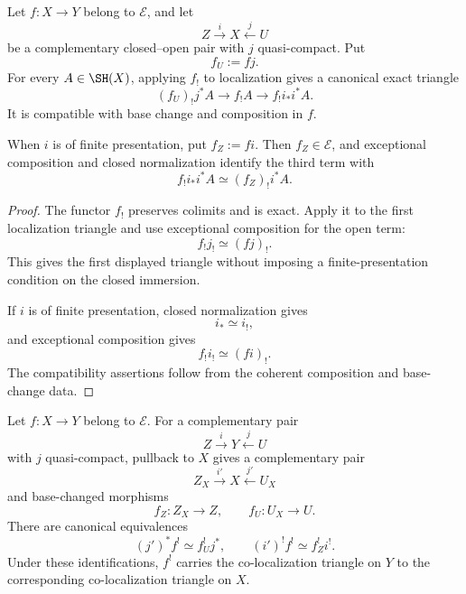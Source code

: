 \begin{proposition}
\label{prop:exceptional-direct-image-localization}
Let \(f:X\to Y\) belong to \(\mathcal E\), and let
\[
    Z\xrightarrow{i}X\xleftarrow{j}U
\]
be a complementary closed--open pair with \(j\) quasi-compact.  Put
\[
    f_U:=fj.
\]
For every \(A\in\SH(X)\), applying \(f_!\) to localization gives a
canonical exact triangle
\[
    (f_U)_!j^*A
    \longrightarrow
    f_!A
    \longrightarrow
    f_!i_*i^*A.
\]
It is compatible with base change and composition in \(f\).

When \(i\) is of finite presentation, put \(f_Z:=fi\).  Then
\(f_Z\in\mathcal E\), and exceptional composition and closed normalization
identify the third term with
\[
    f_!i_*i^*A
    \simeq
    (f_Z)_!i^*A.
\]
\end{proposition}

\begin{proof}
The functor \(f_!\) preserves colimits and is exact.  Apply it to the first
localization triangle and use exceptional composition for the open term:
\[
    f_!j_!
    \simeq
    (fj)_!.
\]
This gives the first displayed triangle without imposing a
finite-presentation condition on the closed immersion.

If \(i\) is of finite presentation, closed normalization gives
\[
    i_*\simeq i_!,
\]
and exceptional composition gives
\[
    f_!i_!
    \simeq
    (fi)_!.
\]
The compatibility assertions follow from the coherent composition and
base-change data.
\end{proof}

\begin{proposition}
\label{prop:exceptional-inverse-colocalization}
Let \(f:X\to Y\) belong to \(\mathcal E\).  For a complementary pair
\[
    Z\xrightarrow{i}Y\xleftarrow{j}U
\]
with \(j\) quasi-compact, pullback to \(X\) gives a complementary pair
\[
    Z_X\xrightarrow{i'}X\xleftarrow{j'}U_X
\]
and base-changed morphisms
\[
    f_Z:Z_X\longrightarrow Z,
    \qquad
    f_U:U_X\longrightarrow U.
\]
There are canonical equivalences
\[
    (j')^*f^!
    \simeq
    f_U^!j^*,
    \qquad
    (i')^!f^!
    \simeq
    f_Z^!i^!.
\]
Under these identifications, \(f^!\) carries the co-localization triangle
on \(Y\) to the corresponding co-localization triangle on \(X\).
\end{proposition}

